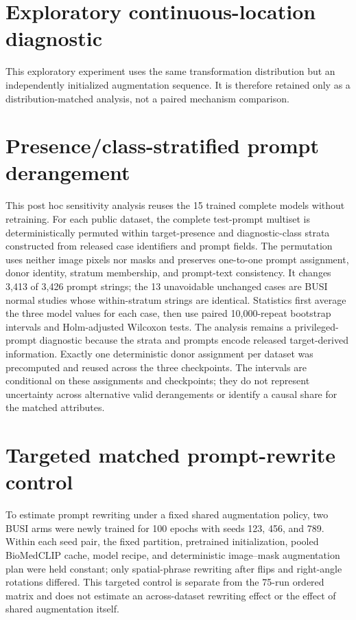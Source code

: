 \documentclass[pdflatex,sn-vancouver-num,referee,lineno]{sn-jnl}
\begin{document}

\FloatBarrier

\section*{Exploratory continuous-location diagnostic}
This exploratory experiment uses the same transformation distribution but an
independently initialized augmentation sequence. It is therefore retained only as
a distribution-matched analysis, not a paired mechanism comparison.

\def\BmcTableSelection{6}

\FloatBarrier

\section*{Presence/class-stratified prompt derangement}
This post hoc sensitivity analysis reuses the 15 trained complete models
without retraining. For each public dataset, the complete
test-prompt multiset is deterministically permuted within target-presence and
diagnostic-class strata constructed from released case identifiers and prompt
fields. The permutation uses neither image pixels nor masks and preserves
one-to-one prompt assignment, donor identity, stratum membership, and prompt-text
consistency.
It changes 3,413 of 3,426 prompt strings; the 13 unavoidable unchanged cases are
BUSI normal studies whose within-stratum strings are identical. Statistics first
average the three model values for each case, then use paired 10,000-repeat
bootstrap intervals and Holm-adjusted Wilcoxon tests. The analysis remains a
privileged-prompt diagnostic because the strata and prompts encode released
target-derived information. Exactly one deterministic donor assignment per
dataset was precomputed and reused across the three checkpoints. The intervals
are conditional on these assignments and checkpoints; they do not represent
uncertainty across alternative valid derangements or identify a causal share for
the matched attributes.


\FloatBarrier


\FloatBarrier

\section*{Targeted matched prompt-rewrite control}
To estimate prompt rewriting under a fixed shared augmentation policy, two BUSI
arms were newly trained for 100 epochs with seeds 123, 456, and 789. Within each
seed pair, the fixed partition, pretrained initialization, pooled BioMedCLIP
cache, model recipe, and deterministic image--mask augmentation plan were held
constant; only spatial-phrase rewriting after flips and right-angle rotations
differed. This targeted control is separate from the 75-run ordered matrix and
does not estimate an across-dataset rewriting effect or the effect of shared
augmentation itself.
\end{document}
